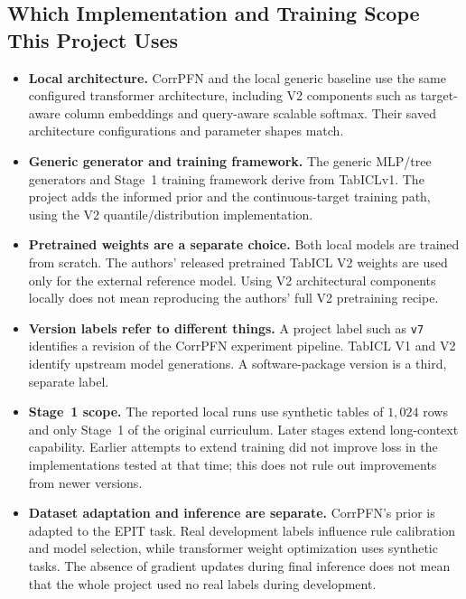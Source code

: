 \documentclass[11pt]{article}
\newenvironment{notes}
  {\begin{itemize}\setlength{\itemsep}{0.45em}\setlength{\parsep}{0pt}}
  {\end{itemize}}
\begin{document}
\subsection{Which Implementation and Training Scope This Project Uses}
\label{sec:tabicl-provenance}

\begin{notes}
    \item \textbf{Local architecture.} CorrPFN and the local
    generic baseline use the same configured transformer
    architecture, including V2 components such as target-aware
    column embeddings and query-aware scalable softmax.
    Their saved architecture configurations and parameter
    shapes match.

    \item \textbf{Generic generator and training framework.}
    The generic MLP/tree generators and Stage~1 training
    framework derive from TabICLv1. The project adds the
    informed prior and the continuous-target training path,
    using the V2 quantile/distribution implementation.

    \item \textbf{Pretrained weights are a separate choice.}
    Both local models are trained from scratch.
    The authors' released pretrained TabICL V2 weights are
    used only for the external reference model. Using V2
    architectural components locally does not mean reproducing
    the authors' full V2 pretraining recipe.

    \item \textbf{Version labels refer to different things.}
    A project label such as \texttt{v7} identifies a revision of
    the CorrPFN experiment pipeline. TabICL V1 and V2 identify
    upstream model generations. A software-package version is
    a third, separate label.

    \item \textbf{Stage~1 scope.} The reported local runs use
    synthetic tables of \(1{,}024\) rows and only Stage~1 of the
    original curriculum. Later stages extend long-context
    capability. Earlier attempts to extend training did not
    improve loss in the implementations tested at that time;
    this does not rule out improvements from newer versions.

    \item \textbf{Dataset adaptation and inference are separate.}
    CorrPFN's prior is adapted to the EPIT task. Real development
    labels influence rule calibration and model selection,
    while transformer weight optimization uses synthetic
    tasks. The absence of gradient updates during final
    inference does not mean that the whole project used no
    real labels during development.


\end{notes}
\end{document}
